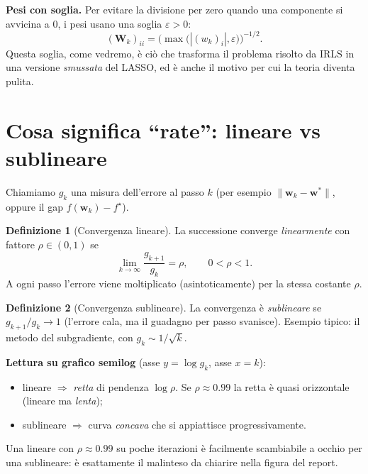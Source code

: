 \documentclass[11pt,a4paper]{article}
\theoremstyle{definition}
\newtheorem{definition}{Definizione}
\newcommand{\w}{\bm{w}}
\newcommand{\wstar}{\w^{*}}
\newcommand{\spec}{\rho}
\newcommand{\eps}{\varepsilon}
\begin{document}
\medskip
\noindent\textbf{Pesi con soglia.} Per evitare la divisione per zero quando una componente si
avvicina a $0$, i pesi usano una soglia $\eps>0$:
\begin{equation}
\label{eq:weights}
(\bm{W}_k)_{ii}=\Big(\max\!\big(|(w_k)_i|,\eps\big)\Big)^{-1/2}.
\end{equation}
Questa soglia, come vedremo, è ciò che trasforma il problema risolto da IRLS in una versione
\emph{smussata} del LASSO, ed è anche il motivo per cui la teoria diventa pulita.

\section{Cosa significa ``rate'': lineare vs sublineare}

Chiamiamo $g_k$ una misura dell'errore al passo $k$ (per esempio $\|\w_k-\wstar\|$, oppure
il gap $f(\w_k)-f^\star$).

\begin{definition}[Convergenza lineare]
La successione converge \emph{linearmente} con fattore $\spec\in(0,1)$ se
\[
\lim_{k\to\infty}\frac{g_{k+1}}{g_k}=\spec,\qquad 0<\spec<1 .
\]
A ogni passo l'errore viene moltiplicato (asintoticamente) per la stessa costante $\spec$.
\end{definition}

\begin{definition}[Convergenza sublineare]
La convergenza è \emph{sublineare} se $g_{k+1}/g_k\to 1$ (l'errore cala, ma il guadagno per
passo svanisce). Esempio tipico: il metodo del subgradiente, con $g_k\sim 1/\sqrt{k}$.
\end{definition}

\begin{keybox}
\textbf{Lettura su grafico semilog} (asse $y=\log g_k$, asse $x=k$):
\begin{itemize}[nosep]
\item lineare $\Rightarrow$ \emph{retta} di pendenza $\log\spec$. Se $\spec\approx0.99$ la
  retta è quasi orizzontale (lineare ma \emph{lenta});
\item sublineare $\Rightarrow$ curva \emph{concava} che si appiattisce progressivamente.
\end{itemize}
Una lineare con $\spec\approx0.99$ su poche iterazioni è facilmente scambiabile a occhio
per una sublineare: è esattamente il malinteso da chiarire nella figura del report.
\end{keybox}
\end{document}
